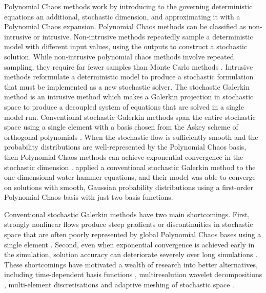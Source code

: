Polynomial Chaos methods work by introducing to the governing deterministic equations an additional, stochastic dimension, and approximating it with a Polynomial Chaos expansion.
Polynomial Chaos methods can be classified as non-intrusive or intrusive.
Non-intrusive methods repeatedly sample a deterministic model with different input values, using the outputs to construct a stochastic solution.
While non-intrusive polynomial chaos methods involve repeated sampling, they require far fewer samples than Monte Carlo methods \citep{ge2008,ge2011}.
Intrusive methods reformulate a deterministic model to produce a stochastic formulation that must be implemented as a new stochastic solver.
The stochastic Galerkin method is an intrusive method which makes a Galerkin projection in stochastic space to produce a decoupled system of equations that are solved in a single model run.
Conventional stochastic Galerkin methods span the entire stochastic space using a single element with a basis chosen from the Askey scheme of orthogonal polynomials \citep{xiu-karniadakis2002}.
When the stochastic flow is sufficiently smooth and the probability distributions are well-represented by the Polynomial Chaos basis, then Polynomial Chaos methods can achieve exponential convergence in the stochastic dimension \citep{xiu-karniadakis2003}.
\citet{sattar-elbeltagy2017} applied a conventional stochastic Galerkin method to the one-dimensional water hammer equations, and their model was able to converge on solutions with smooth, Gaussian probability distributions using a first-order Polynomial Chaos basis with just two basis functions.

Conventional stochastic Galerkin methods have two main shortcomings.
First, strongly nonlinear flows produce steep gradients or discontinuities in stochastic space that are often poorly represented by global Polynomial Chaos bases using a single element \citep{pettersson2014}.
Second, even when exponential convergence is achieved early in the simulation, solution accuracy can deteriorate severely over long simulations \citep{gerritsma2010}.
These shortcomings have motivated a wealth of research into better alternatives, including time-dependent basis functions \citep{gerritsma2010}, multiresolution wavelet decompositions \citep{lemaitre2004a}, multi-element discretisations and adaptive meshing of stochastic space \citep{wan-karniadakis2006,tryoen2010a,pettersson2014,li-stinis2015}.

